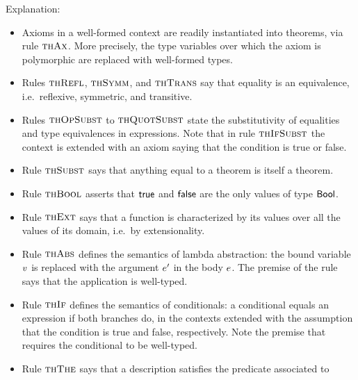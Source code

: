 Explanation:
\begin{itemize}
\item
Axioms in a well-formed context are readily instantiated into theorems, via
rule $\textsc{thAx}$. More precisely, the type variables over which the axiom is
polymorphic are replaced with well-formed types.
\item
Rules $\textsc{thRefl}$, $\textsc{thSymm}$, and $\textsc{thTrans}$ say that equality is an
equivalence, i.e.\ reflexive, symmetric, and transitive.
\item
Rules $\textsc{thOpSubst}$ to $\textsc{thQuotSubst}$ state the substitutivity of equalities and
type equivalences in expressions. Note that in rule $\textsc{thIfSubst}$ the context is
extended with an axiom saying that the condition is true or false.
\item
Rule $\textsc{thSubst}$ says that anything equal to a theorem is itself a theorem.
\item
Rule $\textsc{thBool}$ asserts that $\mathsf{true}$ and $\mathsf{false}$ are the only values of type
$\mathsf{Bool}$.
\item
Rule $\textsc{thExt}$ says that a function is characterized by its values over all
the values of its domain, i.e.\ by extensionality.
\item
Rule $\textsc{thAbs}$ defines the semantics of lambda abstraction: the bound variable
$v$ is replaced with the argument $e'$ in the body $e$. The premise
of the rule says that the application is well-typed.
\item
Rule $\textsc{thIf}$ defines the semantics of conditionals: a conditional equals an
expression if both branches do, in the contexts extended with the assumption
that the condition is true and false, respectively. Note the premise that
requires the conditional to be well-typed.
\item
Rule $\textsc{thThe}$ says that a description satisfies the predicate associated to

\end{itemize}
